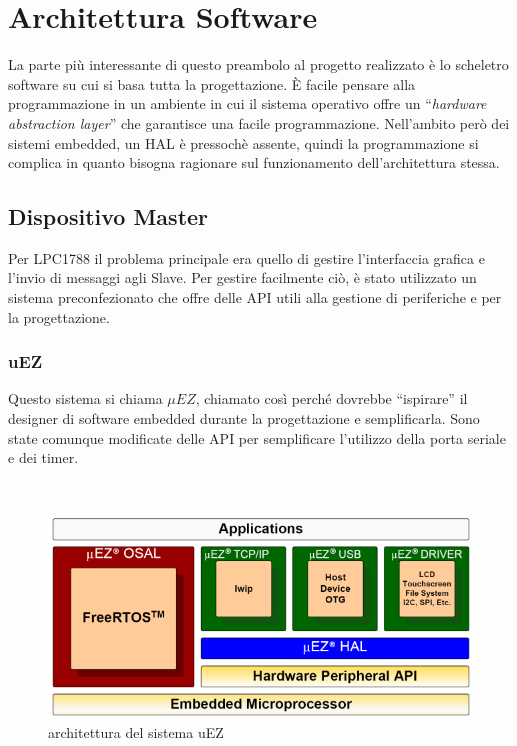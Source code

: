 \documentclass[a4paper,titlepage]{book}
\begin{document}


\chapter{Architettura Software}

La parte più interessante di questo preambolo al progetto realizzato è lo scheletro software su cui si basa tutta la progettazione. È facile pensare alla programmazione in un ambiente in cui il sistema operativo offre un ``\textit{hardware abstraction layer}'' che garantisce una facile programmazione. Nell'ambito però dei sistemi embedded, un HAL è pressochè assente, quindi la programmazione si complica in quanto bisogna ragionare sul funzionamento dell'architettura stessa.


\section{Dispositivo Master}

Per LPC1788 il problema principale era quello di gestire l'interfaccia grafica e l'invio di messaggi agli Slave. Per gestire facilmente ciò, è stato utilizzato un sistema preconfezionato che offre delle API utili alla gestione di periferiche e per la progettazione. 


\subsection{uEZ}
Questo sistema si chiama $\mu EZ$, chiamato così perché dovrebbe ``ispirare'' il designer di software embedded durante la progettazione e semplificarla. Sono state comunque modificate delle API per semplificare l'utilizzo della porta seriale e dei timer.

~

\begin{figure}[!ht]
\centering
\includegraphics[scale=0.7]{uEZ.png}
\caption{architettura del sistema uEZ}
\end{figure}
\end{document}
